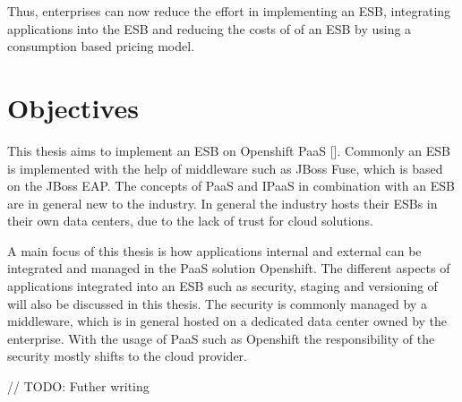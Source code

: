 Thus, enterprises can now reduce the effort in implementing an ESB, integrating applications into the ESB and reducing the costs of of an ESB by using a consumption based pricing model.

\newpage
\section{Objectives}
\label{sec:intro-objectives}
This thesis aims to implement an ESB on Openshift PaaS [\cite{Openshift2018}]. Commonly an ESB is implemented with the help of middleware such as JBoss Fuse, which is based on the JBoss EAP. The concepts of PaaS and IPaaS in combination with an ESB are in general new to the industry. In general the industry hosts their ESBs in their own data centers, due to the lack of trust for cloud solutions. 

A main focus of this thesis is how applications internal and external can be integrated and managed in the PaaS solution Openshift. The different aspects of applications integrated into an ESB such as security, staging and versioning of will also be discussed in this thesis. The security is commonly managed by a middleware, which is in general hosted on a dedicated data center owned by the enterprise. With the usage of PaaS such as Openshift the responsibility of the security mostly shifts to the cloud provider.

// TODO: Futher writing
 



